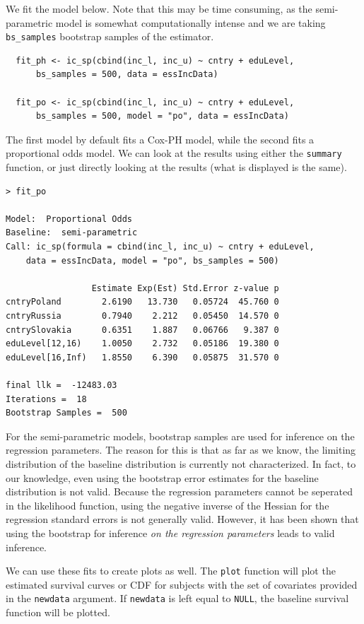 \documentclass[11pt]{report}
\begin{document}
  We fit the model below. Note that this may be time consuming, as the semi-parametric
  model is somewhat computationally intense and we are 
  taking \texttt{bs\_samples} bootstrap samples of the estimator. 
  
  \begin{verbatim}
  fit_ph <- ic_sp(cbind(inc_l, inc_u) ~ cntry + eduLevel,
      bs_samples = 500, data = essIncData)
      
  fit_po <- ic_sp(cbind(inc_l, inc_u) ~ cntry + eduLevel,
      bs_samples = 500, model = "po", data = essIncData)
  \end{verbatim}

  The first model by default fits a Cox-PH model, while the second fits
  a proportional odds model. We can look at the results using either the
  \texttt{summary} function, or just directly looking at the results
  (what is displayed is the same). 
  
  \begin{verbatim}
> fit_po

Model:  Proportional Odds 
Baseline:  semi-parametric 
Call: ic_sp(formula = cbind(inc_l, inc_u) ~ cntry + eduLevel, 
    data = essIncData, model = "po", bs_samples = 500)

                 Estimate Exp(Est) Std.Error z-value p
cntryPoland        2.6190   13.730   0.05724  45.760 0
cntryRussia        0.7940    2.212   0.05450  14.570 0
cntrySlovakia      0.6351    1.887   0.06766   9.387 0
eduLevel[12,16)    1.0050    2.732   0.05186  19.380 0
eduLevel[16,Inf)   1.8550    6.390   0.05875  31.570 0

final llk =  -12483.03 
Iterations =  18 
Bootstrap Samples =  500 
  \end{verbatim}

  For the semi-parametric models, bootstrap samples are used
  for inference on the regression parameters. The reason for this 
  is that as far as we know, the limiting distribution of the 
  baseline distribution is currently not characterized. In fact, to our 
  knowledge, even using the bootstrap error estimates for the baseline
  distribution is not valid. Because the regression parameters cannot
  be seperated in the likelihood function, using the negative inverse of the Hessian
  for the regression standard errors is not generally valid. However, it has been
  shown that using the bootstrap for inference \emph{on the regression parameters}
  leads to valid inference. 

  We can use these fits to create plots as well. The \texttt{plot} function 
  will plot the estimated survival curves or CDF for subjects with the set of 
  covariates provided in the \texttt{newdata} argument. If \texttt{newdata}
  is left equal to \texttt{NULL}, the baseline survival function will be plotted. 
  
\end{document}
